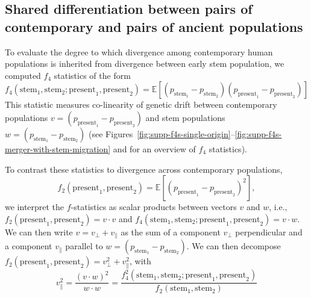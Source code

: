 \documentclass[]{article}
\newcommand{\E}{\mathbb{E}}
\begin{document}
\subsection{Shared differentiation between pairs of contemporary
and pairs of ancient populations}
\label{sec:f4}

To evaluate the degree to which divergence among contemporary human populations is
inherited from divergence between early stem population, we computed $f_4$
statistics of the form
\begin{equation}
    f_4(\text{stem}_1, \text{stem}_2; \text{present}_1, \text{present}_2) = 
    \E[(p_{\text{stem}_1} - p_{\text{stem}_2} )(p_{\text{present}_1} -p_{\text{present}_2} )]
    \label{eq:f4}
\end{equation}
This statistic measures co-linearity of genetic drift between contemporary
populations $v= (p_{\text{present}_1} -p_{\text{present}_2} )$ and stem populations
$w= (p_{\text{stem}_1} -p_{\text{stem}_2} )$ (see
Figures~\ref{fig:supp-f4s-single-origin}--\ref{fig:supp-f4s-merger-with-stem-migration}
and \citet{Lipson2020-cq} for an overview of $f_4$ statistics).

To contrast these statistics to divergence across contemporary populations,
\begin{equation}
    f_2(\text{present}_1, \text{present}_2) =
    \E[(p_{\text{present}_1} -p_{\text{present}_2} )^2],
\end{equation}
we interpret the $f$-statistics as scalar products between vectors $v$ and $w$, i.e.,  
$f_2(\text{present}_1, \text{present}_2) = v\cdot v$ and 
$f_4(\text{stem}_1, \text{stem}_2; \text{present}_1, \text{present}_2) = v\cdot w.$
We can then write $v=v_\perp + v_\parallel$ as the sum of
a component $v_\perp$ perpendicular and
a component $v_\parallel$ parallel to
$w = (p_{\text{stem}_1} -p_{\text{stem}_2} ).$
We can then decompose 
$f_2(\text{present}_1,\text{present}_2) = v_\perp^2+v_\parallel^2$, with  
\begin{equation}
    v_\parallel^2 = \frac{(v \cdot w)^2}{w\cdot w} = \frac{ f_4^2(\text{stem}_1, \text{stem}_2; 
    \text{present}_1, \text{present}_2)}{f_2(\text{stem}_1, \text{stem}_2)}
\end{equation}
\end{document}
